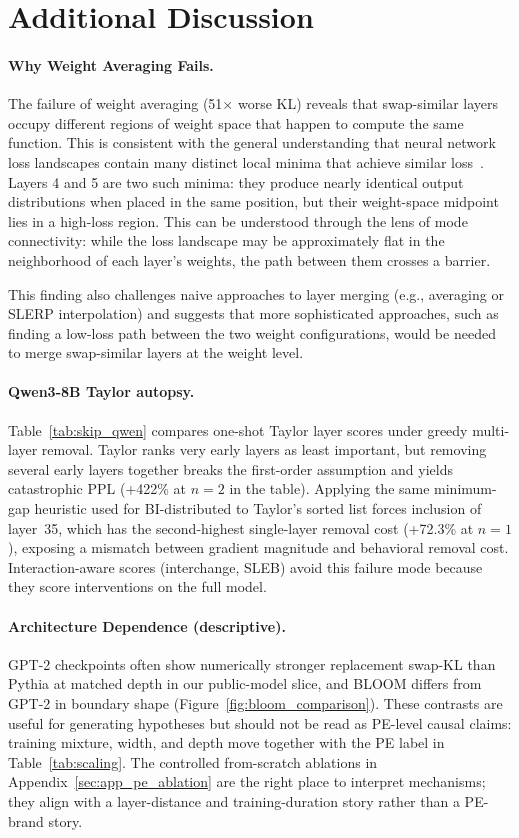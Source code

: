 \documentclass{article}
\begin{document}
\section{Additional Discussion}
\label{sec:app_discussion}

\paragraph{Why Weight Averaging Fails.}
The failure of weight averaging (51$\times$ worse KL) reveals that swap-similar layers occupy different regions of weight space that happen to compute the same function. This is consistent with the general understanding that neural network loss landscapes contain many distinct local minima that achieve similar loss~\citep{frankle2019lottery}. Layers 4 and 5 are two such minima: they produce nearly identical output distributions when placed in the same position, but their weight-space midpoint lies in a high-loss region. This can be understood through the lens of mode connectivity: while the loss landscape may be approximately flat in the neighborhood of each layer's weights, the path between them crosses a barrier.

This finding also challenges naive approaches to layer merging (e.g., averaging or SLERP interpolation) and suggests that more sophisticated approaches, such as finding a low-loss path between the two weight configurations, would be needed to merge swap-similar layers at the weight level.

\paragraph{Qwen3-8B Taylor autopsy.}
Table~\ref{tab:skip_qwen} compares one-shot Taylor layer scores under greedy multi-layer removal. Taylor ranks very early layers as least important, but removing several early layers together breaks the first-order assumption and yields catastrophic PPL (+422\% at $n{=}2$ in the table). Applying the same minimum-gap heuristic used for BI-distributed to Taylor's sorted list forces inclusion of layer~35, which has the second-highest single-layer removal cost (+72.3\% at $n{=}1$), exposing a mismatch between gradient magnitude and behavioral removal cost. Interaction-aware scores (interchange, SLEB) avoid this failure mode because they score interventions on the full model.

\paragraph{Architecture Dependence (descriptive).}
GPT-2 checkpoints often show numerically stronger replacement swap-KL than Pythia at matched depth in our public-model slice, and BLOOM differs from GPT-2 in boundary shape (Figure~\ref{fig:bloom_comparison}). These contrasts are useful for generating hypotheses but should not be read as PE-level causal claims: training mixture, width, and depth move together with the PE label in Table~\ref{tab:scaling}. The controlled from-scratch ablations in Appendix~\ref{sec:app_pe_ablation} are the right place to interpret mechanisms; they align with a layer-distance and training-duration story rather than a PE-brand story.
\end{document}
